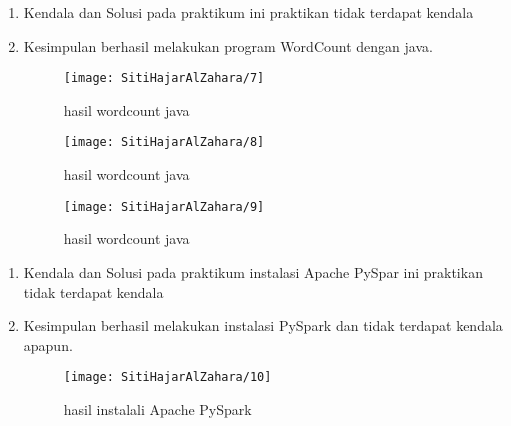 \begin{enumerate}
\item Kendala dan Solusi
\newline pada praktikum ini praktikan tidak terdapat kendala 

\item Kesimpulan
\newline berhasil melakukan program WordCount dengan java.
\begin{figure}[!ht]
\texttt{[image: SitiHajarAlZahara/7]}
\caption{hasil wordcount java}
\label{gam:Hasil}
\end{figure}

\begin{figure}[!ht]
\texttt{[image: SitiHajarAlZahara/8]}
\caption{hasil wordcount java}
\label{gam:Hasil}
\end{figure}

\begin{figure}[!ht]
\texttt{[image: SitiHajarAlZahara/9]}
\caption{hasil wordcount java}
\label{gam:Hasil}
\end{figure}
\end{enumerate}

\begin{enumerate}
\item Kendala dan Solusi
\newline pada praktikum instalasi Apache PySpar ini praktikan tidak terdapat kendala 

\item Kesimpulan
\newline berhasil melakukan instalasi PySpark dan tidak terdapat kendala apapun.
\begin{figure}[!ht]
\texttt{[image: SitiHajarAlZahara/10]}
\caption{hasil instalali Apache PySpark}
\label{gam:Hasil}
\end{figure}
\end{enumerate}
